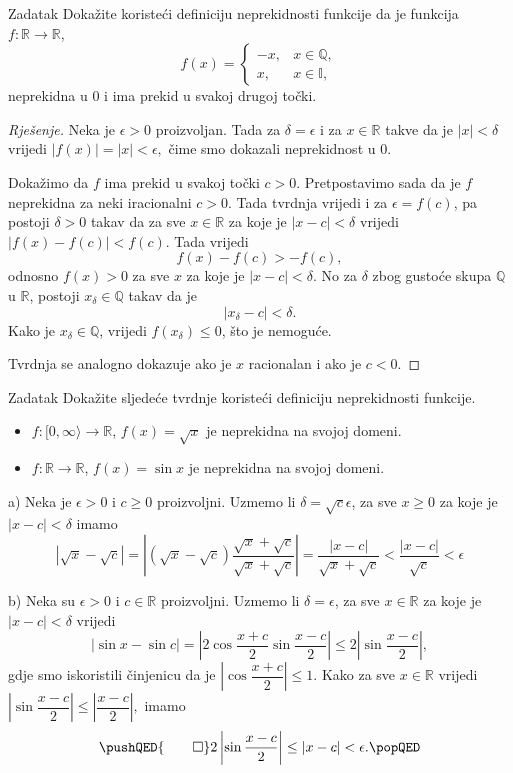 \begin{exercise}{Zadatak}
Dokažite koristeći definiciju neprekidnosti funkcije da je funkcija \(f : \mathbb{R}\to\mathbb{R}\),
\[f(x)=\begin{cases}
-x, & x\in \mathbb{Q},\\
x, & x\in \mathbb{I},
\end{cases}\]
neprekidna u \(0\) i ima prekid u svakoj drugoj točki.
\end{exercise}
\newpage
\begin{proof}[Rješenje]
Neka je \(\epsilon>0\) proizvoljan. Tada za \(\delta=\epsilon\) i za \(x\in \mathbb{R}\) takve da je \(|x|<\delta\) vrijedi \(|f(x)|=|x|<\epsilon,\) čime smo dokazali neprekidnost u \(0\).

Dokažimo da \(f\) ima prekid u svakoj točki \(c>0\). Pretpostavimo sada da je \(f\) neprekidna za neki iracionalni \(c>0\). Tada tvrdnja vrijedi i za \(\epsilon=f(c)\), pa postoji \(\delta>0\) takav da za sve \(x\in \mathbb{R}\) za koje je \(|x-c|<\delta\) vrijedi \(|f(x)-f(c)|<f(c)\). Tada vrijedi \[f(x)-f(c)>-f(c),\] odnosno \(f(x)>0\) za sve \(x\) za koje je \(|x-c|<\delta\). No za \(\delta\) zbog gustoće skupa \(\mathbb{Q}\) u \(\mathbb{R}\), postoji \(x_\delta\in \mathbb{Q}\) takav da je \[|x_\delta-c|<\delta.\] Kako je \(x_\delta\in \mathbb{Q}\), vrijedi \(f(x_\delta)\leq 0\), što je nemoguće. 

Tvrdnja se analogno dokazuje ako je \(x\) racionalan i ako je \(c<0\).
\end{proof}
\begin{exercise}{Zadatak}
\label{cont4}
Dokažite sljedeće tvrdnje koristeći definiciju neprekidnosti funkcije. 
\begin{itemize}
\item[a)] \(f : [0,\infty \rangle\to \mathbb{R}\), \(f(x)=\sqrt{x}\) je neprekidna na svojoj domeni.
\item[b)] \(f : \mathbb{R} \to \mathbb{R}\), \(f(x)=\sin{x}\) je neprekidna na svojoj domeni.
\end{itemize}
\end{exercise}
\begin{proof*}
a) Neka je \(\epsilon>0\) i \(c\geq 0\) proizvoljni. Uzmemo li \(\delta=\sqrt{c}\epsilon\), za sve \(x\geq 0\) za koje je \(|x-c|<\delta\) imamo
\[|\sqrt{x}-\sqrt{c}|=\left\lvert \left(\sqrt{x}-\sqrt{c}\right)\dfrac{\sqrt{x}+\sqrt{c}}{\sqrt{x}+\sqrt{c}}\right\rvert=\dfrac{|x-c|}{\sqrt{x}+\sqrt{c}}<\dfrac{|x-c|}{\sqrt{c}}<\epsilon\]

b) Neka su \(\epsilon>0\) i \(c\in \mathbb{R}\) proizvoljni. Uzmemo li \(\delta=\epsilon\), za sve \(x\in \mathbb{R}\) za koje je \(|x-c|<\delta\) vrijedi
\[\left\lvert \sin{x}-\sin{c}\right\rvert=\left\lvert 2\cos{\dfrac{x+c}{2}}\sin{\dfrac{x-c}{2}}\right\rvert\leq 2\left\lvert \sin{\dfrac{x-c}{2}}\right\rvert,\]
gdje smo iskoristili činjenicu da je \(\left\lvert \cos{\dfrac{x+c}{2}}\right\rvert\leq 1\). Kako za sve \(x\in \mathbb{R}\) vrijedi \(\left\lvert \sin{\dfrac{x-c}{2}}\right\rvert\leq \left\lvert \dfrac{x-c}{2}\right\rvert,\) imamo
\[
\pushQED{\qed}
2\left\lvert \sin{\dfrac{x-c}{2}}\right\rvert\leq |x-c|<\epsilon.\qedhere
\popQED
\]
\end{proof*}

